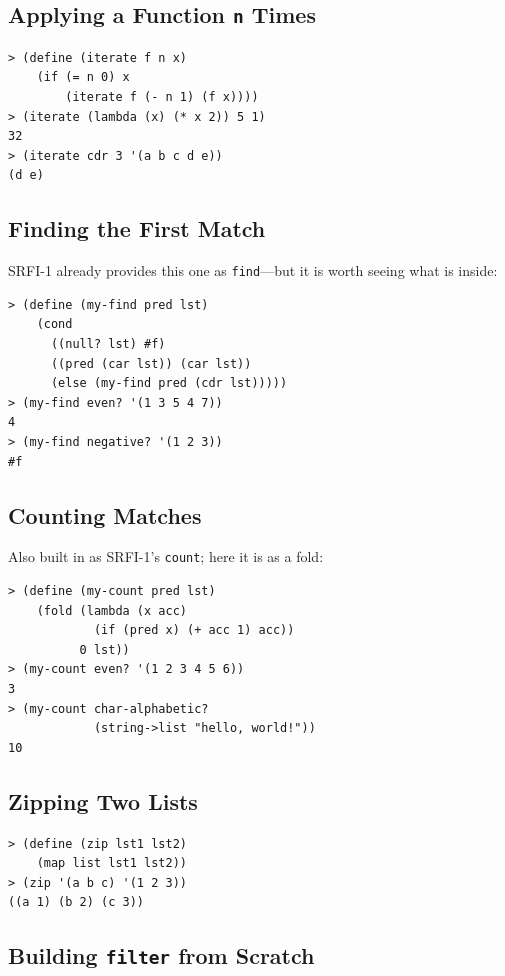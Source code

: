 \subsection{Applying a Function \texttt{n} Times}

\begin{lstlisting}[style=repl]
> (define (iterate f n x)
    (if (= n 0) x
        (iterate f (- n 1) (f x))))
> (iterate (lambda (x) (* x 2)) 5 1)
32
> (iterate cdr 3 '(a b c d e))
(d e)
\end{lstlisting}

\subsection{Finding the First Match}

SRFI-1 already provides this one as \texttt{find}---but it is worth seeing what is inside:

\begin{lstlisting}[style=repl]
> (define (my-find pred lst)
    (cond
      ((null? lst) #f)
      ((pred (car lst)) (car lst))
      (else (my-find pred (cdr lst)))))
> (my-find even? '(1 3 5 4 7))
4
> (my-find negative? '(1 2 3))
#f
\end{lstlisting}

\subsection{Counting Matches}

Also built in as SRFI-1's \texttt{count}; here it is as a fold:

\begin{lstlisting}[style=repl]
> (define (my-count pred lst)
    (fold (lambda (x acc)
            (if (pred x) (+ acc 1) acc))
          0 lst))
> (my-count even? '(1 2 3 4 5 6))
3
> (my-count char-alphabetic?
            (string->list "hello, world!"))
10
\end{lstlisting}

\subsection{Zipping Two Lists}

\begin{lstlisting}[style=repl]
> (define (zip lst1 lst2)
    (map list lst1 lst2))
> (zip '(a b c) '(1 2 3))
((a 1) (b 2) (c 3))
\end{lstlisting}

\subsection{Building \texttt{filter} from Scratch}

